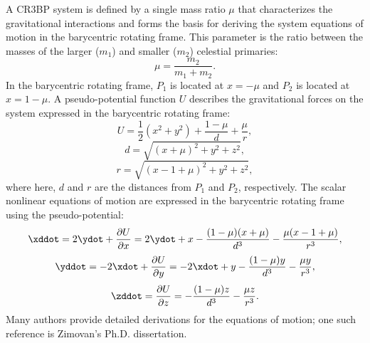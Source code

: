 A CR3BP system is defined by a single mass ratio $\mu$ that characterizes the gravitational
interactions and forms the basis for deriving the system equations of motion in the barycentric
rotating frame. This parameter is the ratio between the masses of the larger ($m_{1}$) and smaller
($m_{2}$) celestial primaries:
\begin{equation}
    \mu=\frac{m_{2}}{m_{1}+m_{2}}.
    \label{eq:mu}
\end{equation}
In the barycentric rotating frame, $P_{1}$ is located at $x=-\mu$ and $P_{2}$ is
located at $x=1-\mu$. A pseudo-potential function $U$ describes the gravitational forces on the
system expressed in the barycentric rotating frame:
\begin{equation}
    U=\frac{1}{2}(x^{2}+y^{2})+\frac{1-\mu}{d}+\frac{\mu}{r},
    \label{eq:pseudopotential}
\end{equation}
\vspace{1mm}
\begin{equation}
    d=\sqrt{(x+\mu)^{2}+y^{2}+z^{2}},
    \label{eq:P1distance}
\end{equation}
\vspace{1mm}
\begin{equation}
    r=\sqrt{(x-1+\mu)^{2}+y^{2}+z^{2}},
    \label{eq:P2distance}
\end{equation}
where here, $d$ and $r$ are the distances from $P_{1}$ and $P_{2}$, respectively. The scalar
nonlinear equations of motion are expressed in the barycentric rotating frame using the
pseudo-potential:
\begin{equation}
    \xddot=2\ydot+\frac{\partial U}{\partial x}=2\ydot+x-\frac{(1-\mu)(x+\mu)}{d^{3}}-\frac{\mu(x-1+\mu)}{r^{3}},
    \label{eq:EoMx}
\end{equation}
\vspace{1mm}
\begin{equation}
    \yddot=-2\xdot+\frac{\partial U}{\partial y}=-2\xdot+y-\frac{(1-\mu)y}{d^{3}}-\frac{\mu y}{r^{3}},
    \label{eq:EoMy}
\end{equation}
\vspace{1mm}
\begin{equation}
    \zddot=\frac{\partial U}{\partial z}=-\frac{(1-\mu)z}{d^{3}}-\frac{\mu z}{r^{3}}.
    \label{eq:EoMz}
\end{equation}
Many authors provide detailed derivations for the equations of motion; one such reference is
Zimovan's Ph.D. dissertation\cite{Zimovan:2017}.

